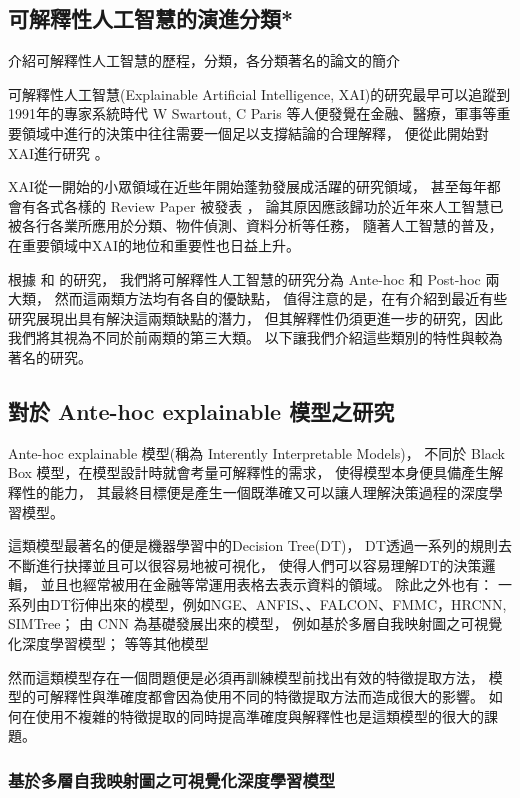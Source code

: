 \documentclass[class=NCU_thesis, crop=false]{standalone}
\begin{document}
\subsection{可解釋性人工智慧的演進分類*}


介紹可解釋性人工智慧的歷程，分類，各分類著名的論文的簡介

可解釋性人工智慧(Explainable Artificial Intelligence, XAI)的研究最早可以追蹤到1991年的專家系統時代 W Swartout, C Paris 等人便發覺在金融、醫療，軍事等重要領域中進行的決策中往往需要一個足以支撐結論的合理解釋，
便從此開始對XAI進行研究 \cite{87686}。

XAI從一開始的小眾領域在近些年開始蓬勃發展成活躍的研究領域，
甚至每年都會有各式各樣的 Review Paper 被發表\cite{A2023100230} \cite{10188681}，
論其原因應該歸功於近年來人工智慧已被各行各業所應用於分類、物件偵測、資料分析等任務，
隨著人工智慧的普及，在重要領域中XAI的地位和重要性也日益上升。

根據 \cite{Nielsen_2022} 和 \cite{LONGO2024102301} 的研究，
我們將可解釋性人工智慧的研究分為 Ante-hoc 和 Post-hoc 兩大類，
然而這兩類方法均有各自的優缺點，
值得注意的是，在\cite{LONGO2024102301}有介紹到最近有些研究展現出具有解決這兩類缺點的潛力，
但其解釋性仍須更進一步的研究，因此我們將其視為不同於前兩類的第三大類。
以下讓我們介紹這些類別的特性與較為著名的研究。

\subsection{對於 Ante-hoc explainable 模型之研究}
Ante-hoc explainable 模型(\cite{Nielsen_2022}稱為 Interently Interpretable Models)，
不同於 Black Box 模型，在模型設計時就會考量可解釋性的需求，
使得模型本身便具備產生解釋性的能力，
其最終目標便是產生一個既準確又可以讓人理解決策過程的深度學習模型。

這類模型最著名的便是機器學習中的Decision Tree(DT)\cite{rokach2016decision}，
DT透過一系列的規則去不斷進行抉擇並且可以很容易地被可視化，
使得人們可以容易理解DT的決策邏輯，
並且也經常被用在金融等常運用表格去表示資料的領域\cite{grinsztajn2022tree}。
除此之外也有：
一系列由DT衍伸出來的模型，例如NGE、ANFIS、、FALCON、FMMC，HRCNN, SIMTree；
由 CNN 為基礎發展出來的模型， 例如基於多層自我映射圖之可視覺化深度學習模型；
等等其他模型

然而這類模型存在一個問題便是必須再訓練模型前找出有效的特徵提取方法，
模型的可解釋性與準確度都會因為使用不同的特徵提取方法而造成很大的影響。
如何在使用不複雜的特徵提取的同時提高準確度與解釋性也是這類模型的很大的課題。

\subsubsection{基於多層自我映射圖之可視覺化深度學習模型}
\end{document}
